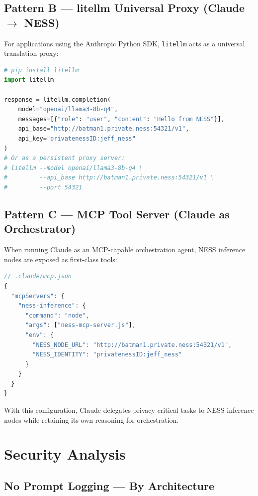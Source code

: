\documentclass[11pt,a4paper]{article}
\begin{document}
\subsection{Pattern B — litellm Universal Proxy (Claude $\to$ NESS)}

For applications using the Anthropic Python SDK, \texttt{litellm} acts as a universal translation proxy:

\begin{lstlisting}[language=Python, caption={litellm as Claude-to-NESS bridge}]
# pip install litellm
import litellm

response = litellm.completion(
    model="openai/llama3-8b-q4",
    messages=[{"role": "user", "content": "Hello from NESS"}],
    api_base="http://batman1.private.ness:54321/v1",
    api_key="privatenessID:jeff_ness"
)
# Or as a persistent proxy server:
# litellm --model openai/llama3-8b-q4 \
#         --api_base http://batman1.private.ness:54321/v1 \
#         --port 54321
\end{lstlisting}

\subsection{Pattern C — MCP Tool Server (Claude as Orchestrator)}

When running Claude as an MCP-capable orchestration agent, NESS inference nodes are exposed as first-class tools:

\begin{lstlisting}[language=JavaScript, caption={MCP server wrapping NESS inference}]
// .claude/mcp.json
{
  "mcpServers": {
    "ness-inference": {
      "command": "node",
      "args": ["ness-mcp-server.js"],
      "env": {
        "NESS_NODE_URL": "http://batman1.private.ness:54321/v1",
        "NESS_IDENTITY": "privatenessID:jeff_ness"
      }
    }
  }
}
\end{lstlisting}

With this configuration, Claude delegates privacy-critical tasks to NESS inference nodes while retaining its own reasoning for orchestration.

\section{Security Analysis}
\label{sec:security}

\subsection{No Prompt Logging — By Architecture}
\end{document}
